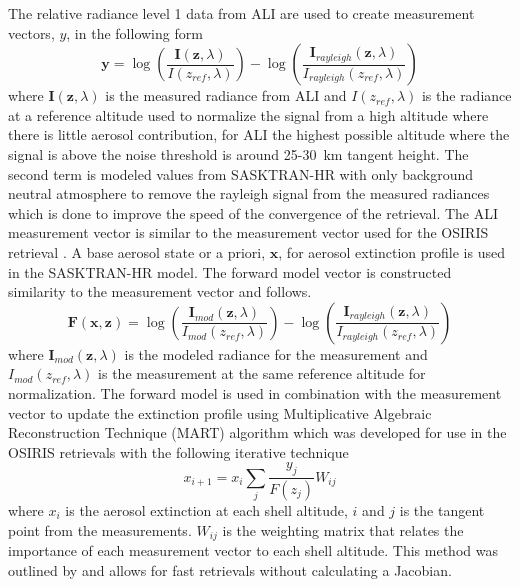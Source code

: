 \documentclass[12pt]{article}
\begin{document}
The relative radiance level 1 data from ALI are used to create measurement vectors, $y$, in the following form
\begin{equation}
    \mathbf{y} = \log\left(\frac{\mathbf{I}(\mathbf{z},\lambda)}{I(z_{ref},\lambda)}\right)-\log\left(\frac{\mathbf{I}_{rayleigh}(\mathbf{z},\lambda)}{I_{rayleigh}(z_{ref},\lambda)}\right)
    \label{eqn:measurementVector}
\end{equation}
where $\mathbf{I}(\mathbf{z},\lambda)$ is the measured radiance from ALI and $I(z_{ref},\lambda)$ is the radiance at a reference altitude used to normalize the signal from a high altitude where there is little aerosol contribution, for ALI the highest possible altitude where the signal is above the noise threshold is around 25-30~km tangent height. The second term is modeled values from SASKTRAN-HR with only background neutral atmosphere to remove the rayleigh signal from the measured radiances which is done to improve the speed of the convergence of the retrieval. The ALI measurement vector is similar to the measurement vector used for the OSIRIS retrieval \citep{Bourassa2007,Bourassa2011}. A base aerosol state or a priori, $\mathbf{x}$, for aerosol extinction profile is used in the SASKTRAN-HR model. The forward model vector is constructed similarity to the measurement vector and follows.
\begin{equation}
    \mathbf{F}(\mathbf{x},\mathbf{z}) = \log\left(\frac{\mathbf{I}_{mod}(\mathbf{z},\lambda)}{I_{mod}(z_{ref},\lambda)}\right)-\log\left(\frac{\mathbf{I}_{rayleigh}(\mathbf{z},\lambda)}{I_{rayleigh}(z_{ref},\lambda)}\right)
    \label{eqn:forwardModel}
\end{equation}
where $\mathbf{I}_{mod}(\mathbf{z},\lambda)$ is the modeled radiance for the measurement and $I_{mod}(z_{ref},\lambda)$ is the measurement at the same reference altitude for normalization. The forward model is used in combination with the measurement vector to update the extinction profile using Multiplicative Algebraic Reconstruction Technique (MART) algorithm which was developed for use in the OSIRIS retrievals \citep{Bourassa2012a} with the following iterative technique
\begin{equation}
    x_{i+1} = x_{i}\sum_{j}\frac{y_{j}}{F(z_{j})}W_{ij}
\end{equation}
where $x_{i}$ is the aerosol extinction at each shell altitude, $i$ and $j$ is the tangent point from the measurements. $W_{ij}$ is the weighting matrix that relates the importance of each measurement vector to each shell altitude. This method was outlined by \cite{Degenstein2009} and allows for fast retrievals without calculating a Jacobian.
\end{document}
